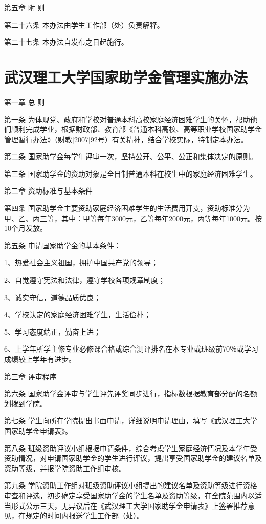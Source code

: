 \documentclass[UTF8,12pt,a4paper]{report}
\begin{document}
第五章 附 则

第二十六条 本办法由学生工作部（处）负责解释。

第二十七条 本办法自发布之日起施行。

\chapter{武汉理工大学国家助学金管理实施办法}
第一章 总 则

第一条 为体现党、政府和学校对普通本科高校家庭经济困难学生的关怀，帮助他们顺利完成学业，根据财政部、教育部《普通本科高校、高等职业学校国家助学金管理暂行办法》（财教[2007]92号）有关精神，结合学校实际，特制定本办法。

第二条 国家助学金每学年评审一次，坚持公开、公平、公正和集体决定的原则。

第三条 国家助学金的资助对象是全日制普通本科在校生中的家庭经济困难学生。

第二章 资助标准与基本条件

第四条 国家助学金主要资助家庭经济困难学生的生活费用开支，资助标准分为甲、乙、丙三等，其中：甲等每年3000元，乙等每年2000元，丙等每年1000元。按10个月发放。

第五条 申请国家助学金的基本条件：

1、热爱社会主义祖国，拥护中国共产党的领导；

2、自觉遵守宪法和法律，遵守学校各项规章制度；

3、诚实守信，道德品质优良；

4、学校认定的家庭经济困难学生，生活俭朴；

5、学习态度端正，勤奋上进；

6、上学年所学主修专业必修课合格或综合测评排名在本专业或班级前70％或学习成绩较上学年有进步。

第三章 评审程序

第六条 国家助学金评审与学生评先评奖同步进行，指标数根据教育部分配的名额划拨到学院。

第七条 学生向所在学院提出书面申请，详细说明申请理由，填写《武汉理工大学国家助学金申请表》。

第八条 班级资助评议小组根据申请条件，综合考虑学生家庭经济情况及本学年受资助情况，对申请国家助学金的学生进行评议，提出享受国家助学金的建议名单及资助等级，并报学院资助工作组审核。

第九条 学院资助工作组对班级资助评议小组提出的建议名单及资助等级进行资格审查和评选，初步确定享受国家助学金的学生名单及资助等级，在全院范围内以适当形式公示三天，无异议后在《武汉理工大学国家助学金申请表》上签署推荐意见，在规定的时间内报送学生工作部（处）。
\end{document}
